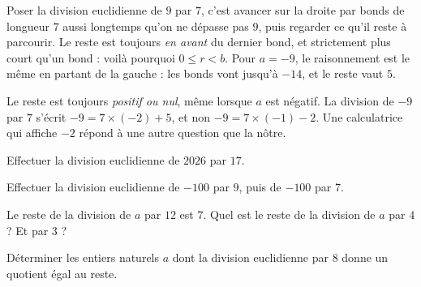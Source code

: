 \begin{visualisation}
\begin{center}
\end{center}

Poser la division euclidienne de $9$ par $7$, c'est avancer sur la droite par
bonds de longueur $7$ aussi longtemps qu'on ne dépasse pas $9$, puis regarder
ce qu'il reste à parcourir. Le reste est toujours \emph{en avant} du dernier
bond, et strictement plus court qu'un bond : voilà pourquoi
$0 \leq r < b$. Pour $a = -9$, le raisonnement est le même en partant de la
gauche : les bonds vont jusqu'à $-14$, et le reste vaut $5$.
\end{visualisation}

\begin{avertissement}
Le reste est toujours \emph{positif ou nul}, même lorsque $a$ est négatif. La
division de $-9$ par $7$ s'écrit $-9 = 7\times(-2)+5$, et non
$-9 = 7\times(-1)-2$. Une calculatrice qui affiche $-2$ répond à une autre
question que la nôtre.
\end{avertissement}

\begin{entrainement}
\exo[\niveau{1}] Effectuer la division euclidienne de $2026$ par $17$.

\exo[\niveau{1}] Effectuer la division euclidienne de $-100$ par $9$, puis de
$-100$ par $7$.

\exo[\niveau{2}] Le reste de la division de $a$ par $12$ est $7$. Quel est le
reste de la division de $a$ par $4$ ? Et par $3$ ?

\exo[\niveau{3}] Déterminer les entiers naturels $a$ dont la division
euclidienne par $8$ donne un quotient égal au reste.
\end{entrainement}


